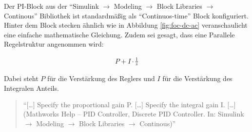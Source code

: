 Der PI-Block aus der \enquote{Simulink $\rightarrow$ Modeling $\rightarrow$ Block Libraries $\rightarrow$ Continous} Bibliothek ist standardmäßig als \enquote{Continuos-time} Block konfiguriert.
Hinter dem Block stecken ähnlich wie in Abbildung \ref{fig:foc-dc-ac} veranschaulicht eine einfache mathematische Gleichung.
Zudem sei gesagt, dass eine Parallele Regelstruktur angenommen wird:

\begin{align}
	P + I\cdot\frac{1}{s}
\end{align}

Dabei steht $P$ für die Verstärkung des Reglers und $I$ für die Verstärkung des Integralen Anteils.

\begin{quote}
	\enquote{[\ldots] Specify the proportional gain P. [\ldots] Specify the integral gain I. [\ldots] (Mathworks Help -- PID Controller, Discrete PID Controller. In: Simulink $\rightarrow$ Modeling $\rightarrow$ Block Libraries $\rightarrow$ Continous)}
\end{quote}

